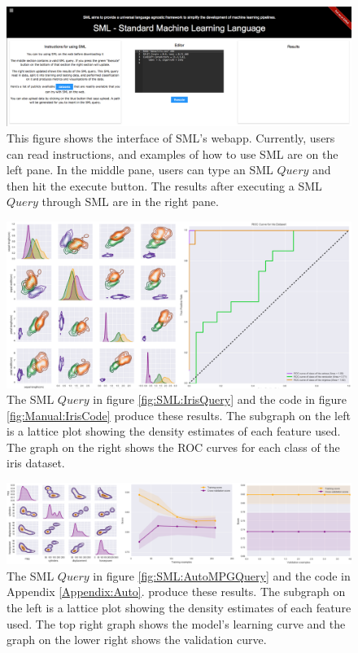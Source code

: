 \begin{figure}
\includegraphics[width=1\textwidth]{figures/SML/sml-web-site.png}
\centering
\caption{This figure shows the interface of SML's webapp. Currently, users can read instructions, and examples of how to use SML are on the left pane. In the middle pane, users can type an SML \(Query\) and then hit the execute button. The results after executing a SML \(Query\) through SML are in the right pane.}
\label{fig:SML:website}
\end{figure}


\begin{figure}
\includegraphics[width=1\textwidth]{figures/SML/iris_results.png}
\centering
\caption{The SML \(Query\) in figure \ref{fig:SML:IrisQuery} and the code in figure \ref{fig:Manual:IrisCode} produce these results. The subgraph on the left is a lattice plot showing the density estimates of each feature used. The graph on the right shows the ROC curves for each class of the iris dataset.}
\label{fig:IrisResults}
\end{figure}

\begin{figure}
\includegraphics[width=1\textwidth]{figures/SML/auto-mpg-results.png}
\centering
\caption{The SML \(Query\) in figure \ref{fig:SML:AutoMPGQuery}  and the code in Appendix \ref{Appendix:Auto}. produce these results. The subgraph on the left is a lattice plot showing the density estimates of each feature used. The top right graph shows the model's learning curve and the graph on the lower right shows the validation curve.}
\label{fig:AutoMPG:Results}
\end{figure}

